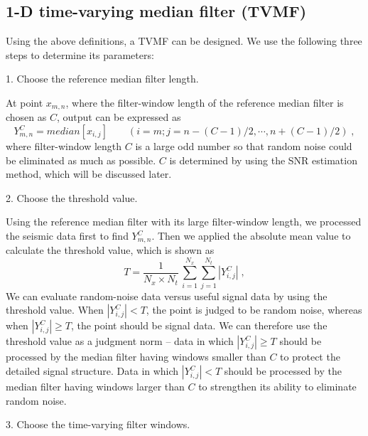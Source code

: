  \subsection{1-D time-varying median filter (TVMF)}

Using the above definitions, a TVMF can be designed. We use the following three steps to determine its parameters:

1. Choose the reference median filter length.

At point $x_{m,n}$, where the filter-window length of the reference 
median filter is chosen as $C$, output can be expressed as
      \begin{equation}
        \label{eq:eq2}
          Y_{m,n}^C = median[x_{i,j}] \qquad (i=m;j=n-(C-1)/2,\cdots,n+(C-1)/2)\;,
      \end{equation}
where filter-window length $C$ is a large odd number 
so that random noise could be eliminated as much as possible. $C$ is determined 
by using the SNR estimation method, which will be discussed later.

2. Choose the threshold value.

Using the reference median filter with its large filter-window length, we processed 
the seismic data first to find $Y_{m,n}^C$. Then we applied the absolute mean value 
to calculate the threshold value, which is shown as
      \begin{equation}
          T = {\frac{1}{N_x \times N_t}}\,{\sum_{i=1}^{N_x}\! \sum_{j=1}^{N_t}|Y_{i,j}^C|}\;,
        \label{eq:eq3}
      \end{equation}
We can evaluate random-noise data versus useful signal data by using the threshold 
value. When $|Y_{i,j}^C|< T$, the point is judged to be random noise, whereas when 
$|Y_{i,j}^C|\ge T$, the point should be signal data. We can therefore use the 
threshold value as a judgment norm -- data in which $|Y_{i,j}^C|\ge T$ should be 
processed by the median filter having windows smaller than $C$ to protect the 
detailed signal structure. Data in which $|Y_{i,j}^C|< T$ should be processed 
by the median filter having windows larger than $C$ to strengthen its ability to 
eliminate random noise.

3. Choose the time-varying filter windows.

